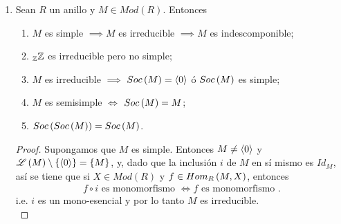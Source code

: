\documentclass{article}
\begin{document}
\begin{enumerate}[label=\textbf{Ej \arabic*.}]
\begin{proof}
\end{proof}

		\item Sean $R$ un anillo y $M\in Mod(R)$. Entonces
		\begin{enumerate}
			\item $M$ es simple $\implies M$ es irreducible $\implies M$ es indescomponible;
			\item $\mathbb{\ringmod{\mathbb{Z}}{\mathbb{Z}}{l}}$ es irreducible pero no simple;
			\item $M$ es irreducible $\implies$ $Soc\left(M\right)=\left< 0\right>$ ó $Soc\left(M\right)$ es simple;
			\item $M$ es semisimple $\iff$ $Soc\left(M\right)=M$;
			\item $Soc\left(Soc\left(M\right)\right)=Soc\left(M\right)$.
		\end{enumerate}
		\begin{proof}
			 Supongamos que $M$ es simple. Entonces $M\neq\left< 0\right>$ y $\mathscr{L}\left(M\right)\setminus\left\{\left< 0\right>\right\}=\left\{M\right\}$, y, dado que la inclusión $i$ de $M$ en sí mismo es $Id_M$, así se tiene que si $X\in Mod(R)$ y $f\in\functhom{M}{X}{R}$, entonces
			\begin{align*}
				f\circ i\text{ es monomorfismo } \iff				f\text{ es monomorfismo }.
			\end{align*}
			i.e. $i$ es un mono-esencial y por lo tanto $M$ es irreducible.\\
			

\end{proof}
\end{enumerate}
\end{document}

